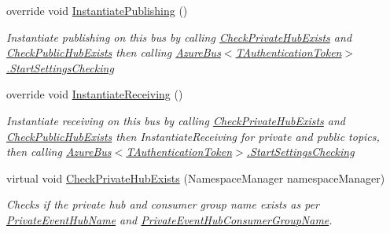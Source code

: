\begin{DoxyCompactItemize}
override void \hyperlink{classCqrs_1_1Azure_1_1ServiceBus_1_1AzureEventHub_a3747fb9fcb3de2a72c8a6d7bbd92db95_a3747fb9fcb3de2a72c8a6d7bbd92db95}{Instantiate\+Publishing} ()
\begin{DoxyCompactList}\small\item\em Instantiate publishing on this bus by calling \hyperlink{classCqrs_1_1Azure_1_1ServiceBus_1_1AzureEventHub_a5eea5010c95290cb4081679538a06555_a5eea5010c95290cb4081679538a06555}{Check\+Private\+Hub\+Exists} and \hyperlink{classCqrs_1_1Azure_1_1ServiceBus_1_1AzureEventHub_ae60a7cddcb566ff8f5cf2ac2db17733e_ae60a7cddcb566ff8f5cf2ac2db17733e}{Check\+Public\+Hub\+Exists} then calling \hyperlink{classCqrs_1_1Azure_1_1ServiceBus_1_1AzureBus_acb7f47329c17646805545e78d0776efe_acb7f47329c17646805545e78d0776efe}{Azure\+Bus$<$\+T\+Authentication\+Token$>$.\+Start\+Settings\+Checking} \end{DoxyCompactList}\item 
override void \hyperlink{classCqrs_1_1Azure_1_1ServiceBus_1_1AzureEventHub_aa725781eddb65bdfe456a4fecb36fb6b_aa725781eddb65bdfe456a4fecb36fb6b}{Instantiate\+Receiving} ()
\begin{DoxyCompactList}\small\item\em Instantiate receiving on this bus by calling \hyperlink{classCqrs_1_1Azure_1_1ServiceBus_1_1AzureEventHub_a5eea5010c95290cb4081679538a06555_a5eea5010c95290cb4081679538a06555}{Check\+Private\+Hub\+Exists} and \hyperlink{classCqrs_1_1Azure_1_1ServiceBus_1_1AzureEventHub_ae60a7cddcb566ff8f5cf2ac2db17733e_ae60a7cddcb566ff8f5cf2ac2db17733e}{Check\+Public\+Hub\+Exists} then Instantiate\+Receiving for private and public topics, then calling \hyperlink{classCqrs_1_1Azure_1_1ServiceBus_1_1AzureBus_acb7f47329c17646805545e78d0776efe_acb7f47329c17646805545e78d0776efe}{Azure\+Bus$<$\+T\+Authentication\+Token$>$.\+Start\+Settings\+Checking} \end{DoxyCompactList}\item 
virtual void \hyperlink{classCqrs_1_1Azure_1_1ServiceBus_1_1AzureEventHub_a5eea5010c95290cb4081679538a06555_a5eea5010c95290cb4081679538a06555}{Check\+Private\+Hub\+Exists} (Namespace\+Manager namespace\+Manager)
\begin{DoxyCompactList}\small\item\em Checks if the private hub and consumer group name exists as per \hyperlink{classCqrs_1_1Azure_1_1ServiceBus_1_1AzureEventHub_ac6802047e00a92ea4b0ae6b69ef7310a_ac6802047e00a92ea4b0ae6b69ef7310a}{Private\+Event\+Hub\+Name} and \hyperlink{classCqrs_1_1Azure_1_1ServiceBus_1_1AzureEventHub_a0c091d0cb19dda3e8bfc20f0e7d30af3_a0c091d0cb19dda3e8bfc20f0e7d30af3}{Private\+Event\+Hub\+Consumer\+Group\+Name}. \end{DoxyCompactList}\item 

\end{DoxyCompactItemize}

